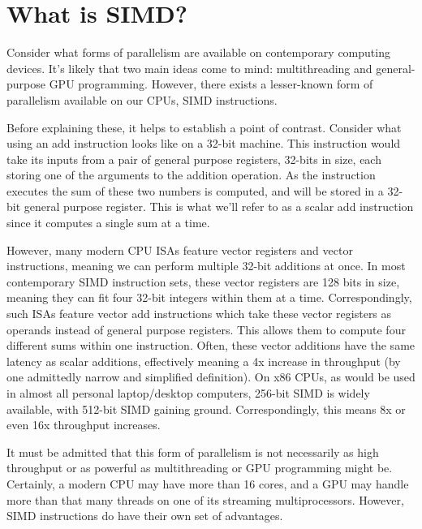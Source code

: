 \chapter{What is SIMD?}
Consider what forms of parallelism are available on contemporary computing
devices. It's likely that two main ideas come to mind: multithreading and
general-purpose GPU programming. However, there exists a lesser-known form of
parallelism available on our CPUs, SIMD instructions.

Before explaining these, it helps to establish a point of contrast. Consider
what using an add instruction looks like on a 32-bit machine. This instruction
would take its inputs from a pair of general purpose registers, 32-bits in size,
each storing one of the arguments to the addition operation. As the instruction
executes the sum of these two numbers is computed, and will be stored in a
32-bit general purpose register. This is what we'll refer to as a scalar add
instruction since it computes a single sum at a time.

However, many modern CPU ISAs feature vector registers and vector instructions,
meaning we can perform multiple 32-bit additions at once. In most contemporary
SIMD instruction sets, these vector registers are 128 bits in size, meaning they
can fit four 32-bit integers within them at a time. Correspondingly, such ISAs
feature vector add instructions which take these vector registers as operands
instead of general purpose registers. This allows them to compute four different
sums within one instruction. Often, these vector additions have the same latency
as scalar additions, effectively meaning a 4x increase in throughput (by one
admittedly narrow and simplified definition). On x86 CPUs, as would be used in
almost all personal laptop/desktop computers, 256-bit SIMD is widely available,
with 512-bit SIMD gaining ground. Correspondingly, this means 8x or even 16x
throughput increases.

It  must be admitted that this form of parallelism is not necessarily as high
throughput or as powerful as multithreading or GPU programming might be.
Certainly, a modern CPU may have more than 16 cores, and a GPU may handle more
than that many threads on one of its streaming multiprocessors. However, SIMD
instructions do have their own set of advantages.


